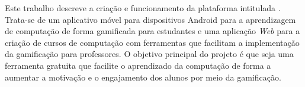 Este trabalho descreve a criação e funcionamento da plataforma intitulada \appName. Trata-se de um aplicativo móvel para dispositivos Android para a aprendizagem de computação de forma gamificada para estudantes e uma aplicação \textit{Web} para a criação de cursos de computação com ferramentas que facilitam a implementação da gamificação para professores. O objetivo principal do projeto é que seja uma ferramenta gratuita que facilite o aprendizado da computação de forma a aumentar a motivação e o engajamento dos alunos por meio da gamificação.